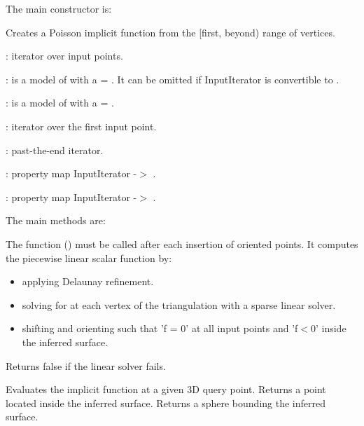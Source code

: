 The main constructor is:

{
Creates a Poisson implicit function from the [first, beyond) range of vertices.
\begin{description}
\item {}: iterator over input points. \item {}: is a model of  with a  = . It can be omitted if InputIterator  is convertible to . \item {}: is a model of  with a  = . \end{description}
\begin{description}
\item {}: iterator over the first input point. \item {}: past-the-end iterator. \item {}: property map InputIterator -$>$ . \item {}: property map InputIterator -$>$ . \end{description}
}

The main methods are:

{
The function () must be called after each insertion of oriented points. It computes the piecewise linear scalar function  by:\begin{itemize}
\item applying Delaunay refinement.\item solving for  at each vertex of the triangulation with a sparse linear solver.\item shifting and orienting  such that 'f = 0' at all input points and 'f$<$0' inside the inferred surface.\end{itemize}
Returns false if the linear solver fails.
}
\ccGlue
{}
{
Evaluates the implicit function at a given 3D query point.
}
\ccGlue
{}
{
Returns a point located inside the inferred surface.
}
{
Returns a sphere bounding the inferred surface.
}

